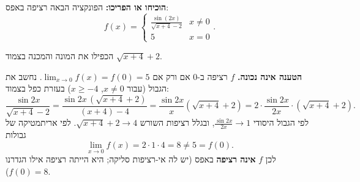 
\begin{question}
\textbf{הוכיחו או הפריכו:} הפונקציה הבאה רציפה באפס:
\[ f(x)=\begin{cases} \frac{\sin(2x)}{\sqrt{x+4}-2} & x\neq 0\\ 5 & x=0\end{cases}. \]
\end{question}

\begin{hint}
הכפילו את המונה והמכנה בצמוד $\sqrt{x+4}+2$.
\end{hint}

\begin{solution}
\textbf{הטענה אינה נכונה.} $f$ רציפה ב-$0$ אם ורק אם $\lim_{x\to0}f(x)=f(0)=5$. נחשב את הגבול (עבור $x\ne0$, $x\ge-4$) בעזרת כפל בצמוד:
\[ \frac{\sin 2x}{\sqrt{x+4}-2}=\frac{\sin 2x\,(\sqrt{x+4}+2)}{(x+4)-4}=\frac{\sin2x}{x}\left(\sqrt{x+4}+2\right)=2\cdot\frac{\sin 2x}{2x}\cdot\left(\sqrt{x+4}+2\right). \]
לפי הגבול היסודי $\frac{\sin2x}{2x}\to1$, ובגלל רציפות השורש $\sqrt{x+4}+2\to4$. לפי אריתמטיקה של גבולות
\[ \lim_{x\to0}f(x)=2\cdot1\cdot4=8\neq5=f(0). \]
לכן $f$ \textbf{אינה רציפה} באפס (יש לה אי-רציפות סליקה; היא הייתה רציפה אילו הגדרנו $f(0)=8$).
\end{solution}
